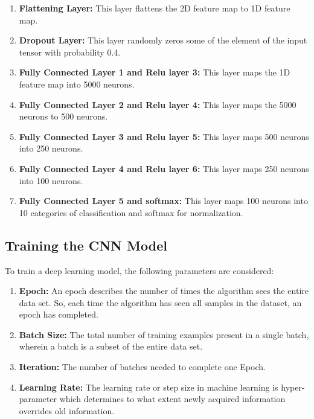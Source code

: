 \documentclass[12pt]{article}
\begin{document}
\begin{enumerate}
	 \item \textbf{Flattening Layer: } This layer flattens the 2D feature map to 1D feature map. 
	 
	 \item \textbf{Dropout Layer:} This layer randomly zeros some of the element of the input tensor with probability 0.4. 
	 
	 \item \textbf{Fully Connected Layer 1 and Relu layer 3:} This layer maps the 1D feature map into 5000 neurons. 
	 
	 \item \textbf{Fully Connected Layer 2 and Relu layer 4:} This layer maps the 5000 neurons to 500 neurons.
	 
	 \item \textbf{Fully Connected Layer 3 and Relu layer 5:} This layer maps 500 neurons into 250 neurons.
	 	 
	 \item \textbf{Fully Connected Layer 4 and Relu layer 6:} This layer maps 250 neurons into 100 neurons.
	 	 
	 \item \textbf{Fully Connected Layer 5 and softmax:} This layer maps 100 neurons into 10 categories of classification and softmax for normalization. 
	 
\end{enumerate}

\subsection{Training the CNN Model}
\label{model_train}
To train a deep learning model, the following parameters are considered:
\begin{enumerate}
	\item \textbf{Epoch:} An epoch describes the number of times the algorithm sees the entire data set. So, each time the algorithm has seen all samples in the dataset, an epoch has completed.
	\item \textbf{Batch Size:} The total number of training examples present in a single batch, wherein a batch is a subset of the entire data set. 
	\item \textbf{Iteration:} The number of batches needed to complete one Epoch.
	\item \textbf{Learning Rate:} The learning rate or step size in machine learning is hyper-parameter which determines to what extent newly acquired information overrides old information.	
\end{enumerate}
\end{document}
